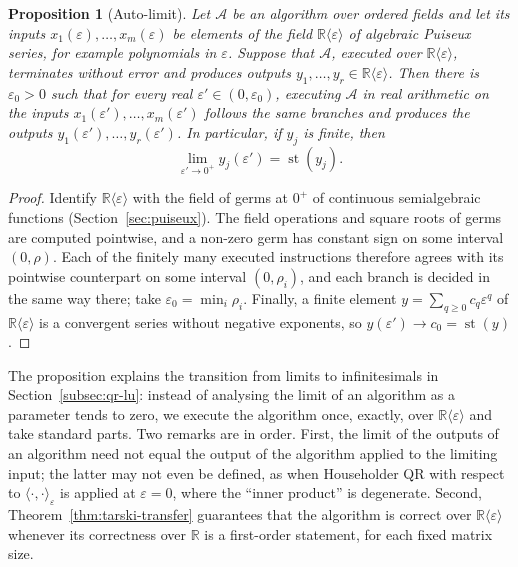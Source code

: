 \documentclass[12pt, a4paper]{report}
\theoremstyle{plain}
\newtheorem{proposition}[theorem]{Proposition}
\theoremstyle{definition}
\theoremstyle{remark}
\theoremstyle{plain}
\newcommand{\RR}{\mathbb{R}}
\newcommand{\st}{\operatorname{st}}
\begin{document}
\begin{proposition}[Auto-limit]\label{prop:autolimit}
Let $\mathcal A$ be an algorithm over ordered fields and let its inputs $x_1(\varepsilon),\dots,x_m(\varepsilon)$ be elements of the field $\RR\langle\varepsilon\rangle$ of algebraic Puiseux series, for example polynomials in $\varepsilon$. Suppose that $\mathcal A$, executed over $\RR\langle\varepsilon\rangle$, terminates without error and produces outputs $y_1,\dots,y_r\in\RR\langle\varepsilon\rangle$. Then there is $\varepsilon_0>0$ such that for every real $\varepsilon'\in(0,\varepsilon_0)$, executing $\mathcal A$ in real arithmetic on the inputs $x_1(\varepsilon'),\dots,x_m(\varepsilon')$ follows the same branches and produces the outputs $y_1(\varepsilon'),\dots,y_r(\varepsilon')$. In particular, if $y_j$ is finite, then
\[ \lim_{\varepsilon'\to0^+}y_j(\varepsilon')=\st(y_j). \]
\end{proposition}
\begin{proof}
Identify $\RR\langle\varepsilon\rangle$ with the field of germs at $0^+$ of continuous semialgebraic functions (Section~\ref{sec:puiseux}). The field operations and square roots of germs are computed pointwise, and a non-zero germ has constant sign on some interval $(0,\rho)$. Each of the finitely many executed instructions therefore agrees with its pointwise counterpart on some interval $(0,\rho_i)$, and each branch is decided in the same way there; take $\varepsilon_0=\min_i\rho_i$. Finally, a finite element $y=\sum_{q\geq0}c_q\varepsilon^q$ of $\RR\langle\varepsilon\rangle$ is a convergent series without negative exponents, so $y(\varepsilon')\to c_0=\st(y)$.
\end{proof}

The proposition explains the transition from limits to infinitesimals in Section~\ref{subsec:qr-lu}: instead of analysing the limit of an algorithm as a parameter tends to zero, we execute the algorithm once, exactly, over $\RR\langle\varepsilon\rangle$ and take standard parts. Two remarks are in order. First, the limit of the outputs of an algorithm need not equal the output of the algorithm applied to the limiting input; the latter may not even be defined, as when Householder QR with respect to $\langle\cdot,\cdot\rangle_\varepsilon$ is applied at $\varepsilon=0$, where the ``inner product'' is degenerate. Second, Theorem~\ref{thm:tarski-transfer} guarantees that the algorithm is correct over $\RR\langle\varepsilon\rangle$ whenever its correctness over $\RR$ is a first-order statement, for each fixed matrix size.
\end{document}

